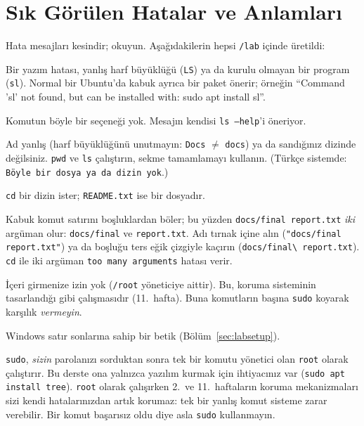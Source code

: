\documentclass[11pt,a4paper]{article}
\newcommand{\cmd}[1]{\texttt{#1}}
\begin{document}
\section{Sık Görülen Hatalar ve Anlamları}
\label{sec:errors}

Hata mesajları kesindir; okuyun. Aşağıdakilerin hepsi \texttt{\tl/lab} içinde üretildi:


\begin{description}[leftmargin=0pt,itemsep=0.25em]
  \item[\texttt{command not found}] Bir yazım hatası, yanlış harf büyüklüğü (\cmd{LS}) ya da kurulu olmayan bir program (\cmd{sl}). Normal bir Ubuntu'da kabuk ayrıca bir paket önerir; örneğin ``Command 'sl' not found, but can be installed with: sudo apt install sl''.
  \item[\texttt{invalid option}] Komutun böyle bir seçeneği yok. Mesajın kendisi \cmd{ls --help}'i öneriyor.
  \item[\texttt{No such file or directory}] Ad yanlış (harf büyüklüğünü unutmayın: \texttt{Docs} $\neq$ \texttt{docs}) ya da sandığınız dizinde değilsiniz. \cmd{pwd} ve \cmd{ls} çalıştırın, sekme tamamlamayı kullanın. (Türkçe sistemde: \texttt{Böyle bir dosya ya da dizin yok}.)
  \item[\texttt{Not a directory}] \cmd{cd} bir dizin ister; \texttt{README.txt} ise bir dosyadır.
  \item[Tek ad için iki hata] Kabuk komut satırını boşluklardan böler; bu yüzden \texttt{docs/final report.txt} \emph{iki} argüman olur: \texttt{docs/final} ve \texttt{report.txt}. Adı tırnak içine alın (\texttt{"docs/final report.txt"}) ya da boşluğu ters eğik çizgiyle kaçırın (\texttt{docs/final\textbackslash\ report.txt}). \cmd{cd} ile iki argüman \texttt{too many arguments} hatası verir.
  \item[\texttt{Permission denied}] İçeri girmenize izin yok (\texttt{/root} yöneticiye aittir). Bu, koruma sisteminin tasarlandığı gibi çalışmasıdır (11.\ hafta). Buna komutların başına \cmd{sudo} koyarak karşılık \emph{vermeyin}.
  \item[\texttt{\$'\textbackslash r': command not found}] Windows satır sonlarına sahip bir betik (Bölüm~\ref{sec:labsetup}).
\end{description}

\begin{tryit}
\cmd{sudo}, \emph{sizin} parolanızı sorduktan sonra tek bir komutu yönetici olan \texttt{root} olarak çalıştırır. Bu derste ona yalnızca yazılım kurmak için ihtiyacınız var (\cmd{sudo apt install tree}). \texttt{root} olarak çalışırken 2.\ ve 11.\ haftaların koruma mekanizmaları sizi kendi hatalarınızdan artık korumaz: tek bir yanlış komut sisteme zarar verebilir. Bir komut başarısız oldu diye asla \cmd{sudo} kullanmayın.
\end{tryit}
\end{document}
